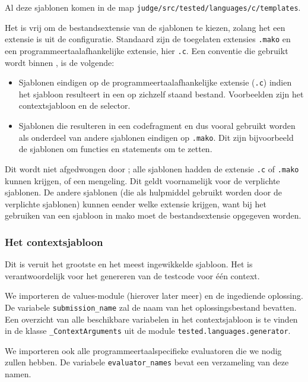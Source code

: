 Al deze sjablonen komen in de map \texttt{judge/src/tested/languages/c/templates}.

Het is vrij om de bestandsextensie van de sjablonen te kiezen, zolang het een extensie is uit de configuratie.
Standaard zijn de toegelaten extensies \texttt{.mako} en een programmeertaalafhankelijke extensie, hier \texttt{.c}.
Een conventie die gebruikt wordt binnen \tested{}, is de volgende:

\begin{itemize}
    \item Sjablonen eindigen op de programmeertaalafhankelijke extensie (\texttt{.c}) indien het sjabloon resulteert in een op zichzelf staand bestand.
    Voorbeelden zijn het contextsjabloon en de selector.
    \item Sjablonen die resulteren in een codefragment en dus vooral gebruikt worden als onderdeel van andere sjablonen eindigen op \texttt{.mako}.
    Dit zijn bijvoorbeeld de sjablonen om functies en statements om te zetten.
\end{itemize}

Dit wordt niet afgedwongen door \tested{};
alle sjablonen hadden de extensie \texttt{.c} of \texttt{.mako} kunnen krijgen, of een mengeling.
Dit geldt voornamelijk voor de verplichte sjablonen.
De andere sjablonen (die als hulpmiddel gebruikt worden door de verplichte sjablonen) kunnen eender welke extensie krijgen, want bij het gebruiken van een sjabloon in mako moet de bestandsextensie opgegeven worden.

\subsubsection{Het contextsjabloon}

Dit is veruit het grootste en het meest ingewikkelde sjabloon.
Het is verantwoordelijk voor het genereren van de testcode voor één context.

We importeren de values-module (hierover later meer) en de ingediende oplossing.
De variabele \texttt{submission\_name} zal de naam van het oplossingsbestand bevatten.
Een overzicht van alle beschikbare variabelen in het contextsjabloon is te vinden in de klasse \texttt{\_ContextArguments} uit de module \texttt{tested.languages.generator}.

We importeren ook alle programmeertaalspecifieke evaluatoren die we nodig zullen hebben.
De variabele \texttt{evaluator\_names} bevat een verzameling van deze namen.

\inputminted[firstline=3,lastline=7]{mako}{sources/c-context.mako}
\vspace{-1.7cm} %
\inputminted[firstline=9,lastline=11]{mako}{sources/c-context.mako}


